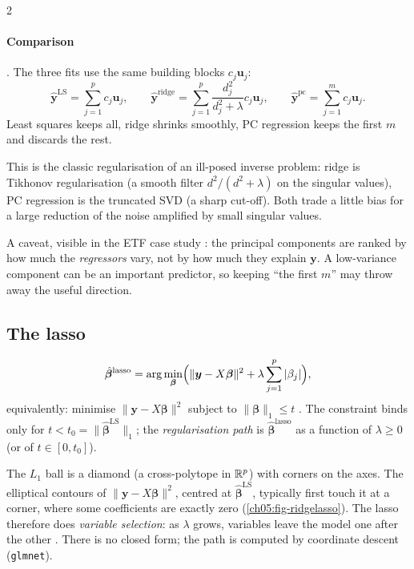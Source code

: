 \begin{paracol}{2}
\paragraph{Comparison} . The three fits use the same building blocks $c_j\bm u_j$:
\[
  \hat{\bm y}^{\text{LS}}=\sum_{j=1}^pc_j\bm u_j,\qquad
  \hat{\bm y}^{\text{ridge}}=\sum_{j=1}^p\frac{d_j^2}{d_j^2+\lambda}c_j\bm u_j,\qquad
  \hat{\bm y}^{\text{pc}}=\sum_{j=1}^mc_j\bm u_j .
\]
Least squares keeps all, ridge shrinks smoothly, PC regression keeps the first $m$ and discards the rest.

\begin{intuition}
This is the classic regularisation of an ill-posed inverse problem: ridge is Tikhonov regularisation (a smooth
filter $d^2/(d^2+\lambda)$ on the singular values), PC regression is the truncated SVD (a sharp cut-off). Both trade a
little bias for a large reduction of the noise amplified by small singular values.
\end{intuition}

A caveat, visible in the ETF case study : the principal components are ranked by how much the
\emph{regressors} vary, not by how much they explain $\bm y$. A low-variance component can be an important predictor,
so keeping ``the first $m$'' may throw away the useful direction.

\subsection{The lasso}
\begin{definition}[Lasso]
\[
  \hat{\bm\beta}^{\text{lasso}}=\arg\min_{\bm\beta}\Bigl(\|\bm y-X\bm\beta\|^2+\lambda\sum_{j=1}^p|\beta_j|\Bigr),
\]
equivalently: minimise $\|\bm y-X\bm\beta\|^2$ subject to $\|\bm\beta\|_1\le t$ . The constraint binds only for
$t<t_0=\|\hat{\bm\beta}^{\text{LS}}\|_1$; the \emph{regularisation path} is $\hat{\bm\beta}^{\text{lasso}}$ as a function of $\lambda\ge0$ (or of
$t\in[0,t_0]$).
\end{definition}
The $L_1$ ball is a diamond (a cross-polytope in $\mathbb{R}^p$) with corners on the axes. The elliptical contours of
$\|\bm y-X\bm\beta\|^2$, centred at $\hat{\bm\beta}^{\text{LS}}$, typically first touch it at a corner, where some coefficients are exactly
zero  (\cref{ch05:fig-ridgelasso}). The lasso therefore does \emph{variable selection}: as $\lambda$ grows,
variables leave the model one after the other . There is no closed form; the path is computed by
coordinate descent (\texttt{glmnet}).


\end{paracol}
